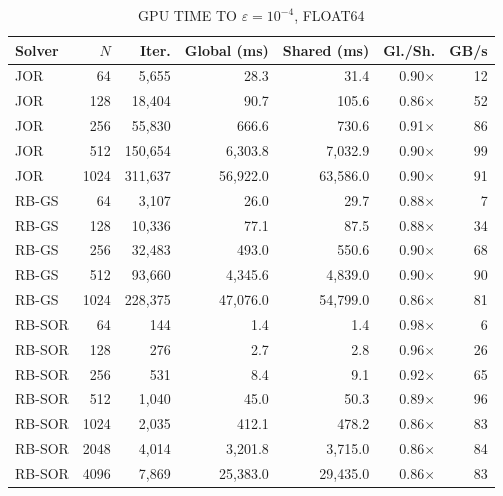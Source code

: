 \begin{table}[t]
\centering
\caption{GPU TIME TO $\varepsilon = 10^{-4}$, FLOAT64}
\label{tab:gpu}
\begin{tabular}{lrrrrrr}
\hline
Solver & $N$ & Iter. & Global (ms) & Shared (ms) & Gl./Sh. & GB/s \\
\hline
JOR    & 64   & 5,655   & 28.3     & 31.4     & 0.90$\times$ & 12 \\
JOR    & 128  & 18,404  & 90.7     & 105.6    & 0.86$\times$ & 52 \\
JOR    & 256  & 55,830  & 666.6    & 730.6    & 0.91$\times$ & 86 \\
JOR    & 512  & 150,654 & 6,303.8  & 7,032.9  & 0.90$\times$ & 99 \\
JOR    & 1024 & 311,637 & 56,922.0 & 63,586.0 & 0.90$\times$ & 91 \\
RB-GS  & 64   & 3,107   & 26.0     & 29.7     & 0.88$\times$ & 7  \\
RB-GS  & 128  & 10,336  & 77.1     & 87.5     & 0.88$\times$ & 34 \\
RB-GS  & 256  & 32,483  & 493.0    & 550.6    & 0.90$\times$ & 68 \\
RB-GS  & 512  & 93,660  & 4,345.6  & 4,839.0  & 0.90$\times$ & 90 \\
RB-GS  & 1024 & 228,375 & 47,076.0 & 54,799.0 & 0.86$\times$ & 81 \\
RB-SOR & 64   & 144     & 1.4      & 1.4      & 0.98$\times$ & 6  \\
RB-SOR & 128  & 276     & 2.7      & 2.8      & 0.96$\times$ & 26 \\
RB-SOR & 256  & 531     & 8.4      & 9.1      & 0.92$\times$ & 65 \\
RB-SOR & 512  & 1,040   & 45.0     & 50.3     & 0.89$\times$ & 96 \\
RB-SOR & 1024 & 2,035   & 412.1    & 478.2    & 0.86$\times$ & 83 \\
RB-SOR & 2048 & 4,014   & 3,201.8  & 3,715.0  & 0.86$\times$ & 84 \\
RB-SOR & 4096 & 7,869   & 25,383.0 & 29,435.0 & 0.86$\times$ & 83 \\
\hline
\end{tabular}
\end{table}

